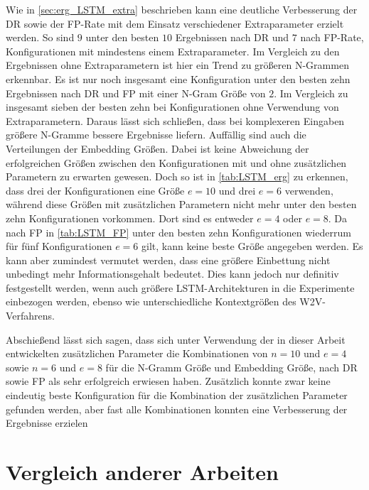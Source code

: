 Wie in \autoref{sec:erg_LSTM_extra} beschrieben kann eine deutliche Verbesserung der \ac{DR} sowie  der \ac{FP}-Rate mit dem Einsatz verschiedener Extraparameter erzielt werden.
So sind $9$ unter den besten $10$ Ergebnissen nach \ac{DR} und $7$ nach \ac{FP}-Rate, Konfigurationen mit mindestens einem Extraparameter.
Im Vergleich zu den Ergebnissen ohne Extraparametern ist hier ein Trend zu größeren N-Grammen erkennbar.
Es ist nur noch insgesamt eine Konfiguration unter den besten zehn Ergebnissen nach \ac{DR} und \ac{FP} mit einer N-Gram Größe von $2$.
Im Vergleich zu insgesamt sieben  der besten zehn bei Konfigurationen ohne Verwendung von Extraparametern.
Daraus lässt sich schließen, dass bei komplexeren Eingaben größere N-Gramme bessere Ergebnisse liefern. 
Auffällig sind auch die Verteilungen der Embedding Größen.
Dabei ist keine Abweichung der erfolgreichen Größen zwischen den Konfigurationen mit und ohne zusätzlichen Parametern zu erwarten gewesen.
Doch so ist in \autoref{tab:LSTM_erg} zu erkennen, dass drei der Konfigurationen eine Größe $e=10$ und drei $e=6$ verwenden, während diese Größen mit zusätzlichen Parametern nicht mehr unter den besten zehn Konfigurationen vorkommen.
Dort sind es entweder $e=4$ oder $e=8$.
Da nach \ac{FP} in \autoref{tab:LSTM_FP} unter den besten zehn Konfigurationen wiederrum für fünf Konfigurationen $e=6$ gilt, kann keine beste Größe angegeben werden.
Es kann aber zumindest vermutet werden, dass eine größere Einbettung nicht unbedingt mehr Informationsgehalt bedeutet.
Dies kann jedoch nur definitiv festgestellt werden, wenn auch größere \ac{LSTM}-Architekturen in die Experimente einbezogen werden, ebenso wie unterschiedliche Kontextgrößen des \ac{W2V}-Verfahrens.

Abschießend lässt sich sagen, dass sich unter Verwendung der in dieser Arbeit entwickelten zusätzlichen Parameter die Kombinationen von $n=10$ und $e=4$ sowie $n=6$ und $e=8$ für die N-Gramm Größe und Embedding Größe, nach \ac{DR} sowie \ac{FP} als sehr erfolgreich erwiesen haben.
Zusätzlich konnte zwar keine eindeutig beste Konfiguration für die Kombination der zusätzlichen Parameter gefunden werden, aber fast alle Kombinationen konnten eine Verbesserung der Ergebnisse erzielen

\section{Vergleich anderer Arbeiten}\label{sec:folgerungen_vgl}

